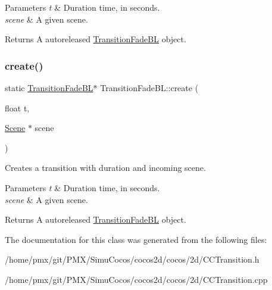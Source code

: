 \begin{DoxyParams}{Parameters}
{\em t} & Duration time, in seconds. \\
\hline
{\em scene} & A given scene. \\
\hline
\end{DoxyParams}
\begin{DoxyReturn}{Returns}
A autoreleased \hyperlink{classTransitionFadeBL}{Transition\+Fade\+BL} object. 
\end{DoxyReturn}
\mbox{\label{classTransitionFadeBL_aa2728c3f268c9ace4de1e5f1208fdf50}} 
\subsubsection{\texorpdfstring{create()}{create()}\hspace{0.1cm}{\footnotesize\ttfamily [2/2]}}
{\footnotesize\ttfamily static \hyperlink{classTransitionFadeBL}{Transition\+Fade\+BL}$\ast$ Transition\+Fade\+B\+L\+::create (\begin{DoxyParamCaption}\item[{float}]{t,  }\item[{\hyperlink{classScene}{Scene} $\ast$}]{scene }\end{DoxyParamCaption})\hspace{0.3cm}{\ttfamily [static]}}

Creates a transition with duration and incoming scene.


\begin{DoxyParams}{Parameters}
{\em t} & Duration time, in seconds. \\
\hline
{\em scene} & A given scene. \\
\hline
\end{DoxyParams}
\begin{DoxyReturn}{Returns}
A autoreleased \hyperlink{classTransitionFadeBL}{Transition\+Fade\+BL} object. 
\end{DoxyReturn}


The documentation for this class was generated from the following files\+:\begin{DoxyCompactItemize}
\item 
/home/pmx/git/\+P\+M\+X/\+Simu\+Cocos/cocos2d/cocos/2d/C\+C\+Transition.\+h\item 
/home/pmx/git/\+P\+M\+X/\+Simu\+Cocos/cocos2d/cocos/2d/C\+C\+Transition.\+cpp\end{DoxyCompactItemize}
